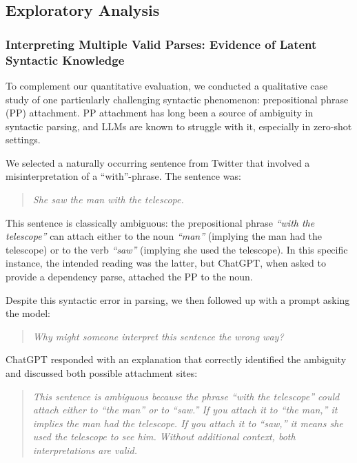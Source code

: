 \subsection{Exploratory Analysis}
\label{subsec:exploratory}

\subsubsection{Interpreting Multiple Valid Parses: Evidence of Latent Syntactic Knowledge}

\label{subsec:pp-attachment}

To complement our quantitative evaluation, we conducted a qualitative case study of one particularly challenging syntactic phenomenon: prepositional phrase (PP) attachment. PP attachment has long been a source of ambiguity in syntactic parsing, and LLMs are known to struggle with it, especially in zero-shot settings.

We selected a naturally occurring sentence from Twitter that involved a misinterpretation of a “with”-phrase. The sentence was:

\begin{quote}
    \textit{She saw the man with the telescope.}
\end{quote}

This sentence is classically ambiguous: the prepositional phrase \textit{“with the telescope”} can attach either to the noun \textit{“man”} (implying the man had the telescope) or to the verb \textit{“saw”} (implying she used the telescope). In this specific instance, the intended reading was the latter, but ChatGPT, when asked to provide a dependency parse, attached the PP to the noun.

Despite this syntactic error in parsing, we then followed up with a prompt asking the model:

\begin{quote}
    \textit{Why might someone interpret this sentence the wrong way?}
\end{quote}

ChatGPT responded with an explanation that correctly identified the ambiguity and discussed both possible attachment sites:

\begin{quote}
    \textit{This sentence is ambiguous because the phrase “with the telescope” could attach either to “the man” or to “saw.” If you attach it to “the man,” it implies the man had the telescope. If you attach it to “saw,” it means she used the telescope to see him. Without additional context, both interpretations are valid.}
\end{quote}

